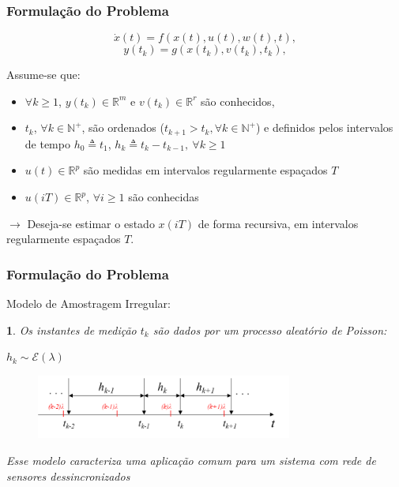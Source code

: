 \documentclass{beamer}
\renewcommand{\(}{\left(}
\renewcommand{\)}{\right)}
\renewcommand{\[}{\left[}
\renewcommand{\]}{\right]}
\newtheorem{definicao}{}
\begin{document}

\begin{frame}
	\frametitle{Formulação do Problema}
	
	\begin{equation*}\label{eq:processo}
	\dot{x}(t)=f(x(t),u(t),w(t),t),
	\end{equation*}
	\begin{equation*}\label{eq:obs}
	y(t_k)=g(x(t_k),v(t_k),t_k),
	\end{equation*}
	\vspace{0.2cm}
	
	Assume-se que:
	
	\begin{itemize}
		\item $\forall k \geq 1$, $y(t_k) \in \mathbb{R}^m$ e $v(t_k) \in \mathbb{R}^r$ são conhecidos,
		\item $t_k$, $\forall k \in \mathbb{N^+}$, são ordenados ($t_{k+1}>t_k,\forall k \in \mathbb{N^+}$) e definidos pelos intervalos de tempo $h_0 \triangleq t_1$, $h_k \triangleq t_k-t_{k-1}, \ \forall k \geq 1$
		\item $u(t) \in \mathbb{R}^p$ são medidas em intervalos regularmente espaçados $T$ 
		\item $u(iT) \in \mathbb{R}^p$, $\forall i \geq 1$ são conhecidas
	\end{itemize}
	
	\vspace{0.3cm}
	
	$\rightarrow$ Deseja-se estimar o estado $x(iT)$ de forma recursiva, em intervalos regularmente espaçados $T$.

\end{frame}


\begin{frame}
	\frametitle{Formulação do Problema}
	Modelo de Amostragem Irregular:
	
	\begin{definicao}
		Os instantes de medição $t_k$ são dados por um processo aleatório de Poisson:
		
		\centering
		$h_k \sim \mathcal{E} (\lambda)$
	\end{definicao}
	
	\begin{figure}
		\centering
		\includegraphics[width=0.75\textwidth]{images/processo_amost.png}
	\end{figure}
	
	\small
	\centering
	\textit{Esse modelo caracteriza uma aplicação comum para um sistema com rede de sensores dessincronizados \cite{Micheli2002}}

\end{frame}
\end{document}
